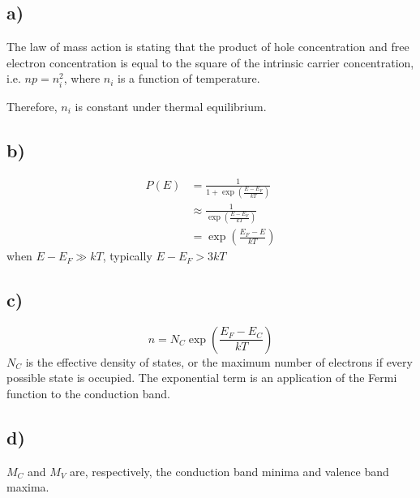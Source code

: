 \subsection*{a)}
The law of mass action is stating that the product of hole concentration and free electron concentration is equal to the square of the intrinsic carrier concentration, i.e. $n p = n_i^2$, where $n_i$ is a function of temperature.

Therefore, $n_i$ is constant under thermal equilibrium.
\subsection*{b)}
\[
\begin{aligned}
P(E) &= \frac{1}{1+\exp\left(\frac{E-E_F}{k T}\right)} \\
&\approx \frac{1}{\exp\left(\frac{E-E_F}{k T}\right)} \\
&= \exp\left(\frac{E_F - E}{k T}\right)
\end{aligned}
\]
when $E - E_F \gg k T$, typically $E - E_F > 3 k T $
\subsection*{c)}
$$n = N_C \exp \left(\frac{E_F - E_C}{k T} \right)$$
$N_C$ is the effective density of states, or the maximum number of electrons if every possible state is occupied.
The exponential term is an application of the Fermi function to the conduction band.
\subsection*{d)}
$M_C$ and $M_V$ are, respectively, the conduction band minima and valence band maxima. %